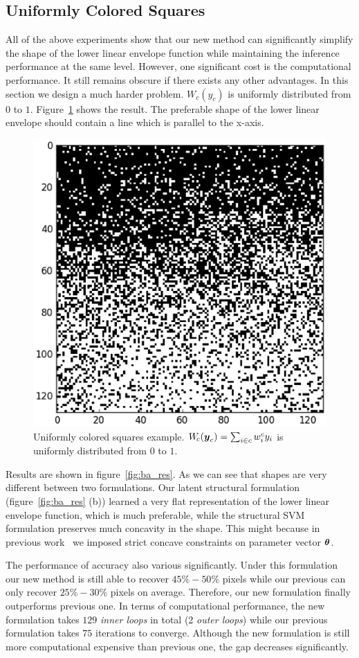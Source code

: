 \bigskip
\bigskip
\bigskip
\bigskip
\bigskip
\bigskip

\subsection{Uniformly Colored Squares}
\label{sec:unif-distr-squar}

All of the above experiments show that our new method can
significantly simplify the shape of the lower linear envelope
function while maintaining the inference performance at the same
level. However, one significant cost is the computational
performance. It still remains obscure if there exists any other
advantages. In this section we design a much harder problem.
$W_c(y_c)$ is uniformly distributed from $0$ to $1$.
Figure~\ref{fig:ba_gt} shows the result. The preferable shape of
the lower linear envelope should contain a line which is parallel
to the x-axis.

\begin{figure}[t]
  \centering
  \includegraphics[width=0.5\columnwidth]{Experiments/figures/ba_gt.png}
  \caption{\label{fig:ba_gt} Uniformly colored squares example.
    $W_{\!c}({\boldsymbol{y}}_c) = \sum_{i \in c} w^c_i y_i$ is uniformly
    distributed from $0$ to $1$.}
\end{figure}

Results are shown in figure~\ref{fig:ba_res}. As we can see
that shapes are very different between two formulations. Our
latent structural formulation (figure~\ref{fig:ba_res} (b))
learned a very flat representation of the lower linear envelope
function, which is much preferable, while the structural SVM
formulation preserves much concavity in the shape. This might
because in previous work~\cite{gouldlearning,Gould:ICML2011}
we imposed strict concave constraints on parameter vector
$\boldsymbol{\theta}$.

The performance of accuracy also various significantly. Under
this formulation our new method is still able to recover
$45\%-50\%$ pixels while our previous can only recover
$25\%-30\%$ pixels on average. Therefore, our new formulation
finally outperforms previous one. In terms of computational
performance, the new formulation takes $129$ \emph{inner loops}
in total (2 \emph{outer loops}) while our previous formulation
takes $75$ iterations to converge. Although the new formulation
is still more computational expensive than previous one, the gap
decreases significantly.

